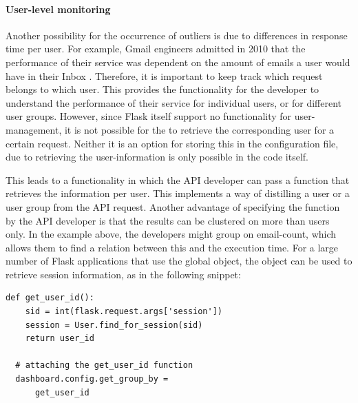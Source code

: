 \documentclass[conference]{IEEEtran}
\begin{document}
  \paragraph{User-level monitoring}
  \label{sec:user-monitoring}
  Another possibility for the occurrence of outliers is due to differences in response time per user. For example, Gmail engineers admitted in 2010 that the performance of their service was dependent on the amount of emails a user would have in their Inbox \cite{gmail}. Therefore, it is important to keep track which request belongs to which user. This provides the functionality for the developer to understand the performance of their service for individual users, or for different user groups. However, since Flask itself support no functionality for user-management, it is not possible for the \tool to retrieve the corresponding user for a certain request. Neither it is an option for storing this in the configuration file, due to retrieving the user-information is only possible in the code itself.
  
This leads to a functionality in which the API developer can pass a function that retrieves the information per user. This implements a way of distilling a user or a user group from the API request. Another advantage of specifying the function by the API developer is that the results can be clustered on more than users only. In the example above, the developers might group on email-count, which allows them to find a relation between this and the execution time. For a large number of Flask applications that use the global  object, the object can be used to retrieve session information, as in the following snippet: 
  
  \begin{lstlisting}[style=custompython,caption=App specific way of extracting the user from a Flask request object]
  def get_user_id():
    sid = int(flask.request.args['session'])
    session = User.find_for_session(sid)
    return user_id
  
  # attaching the get_user_id function
  dashboard.config.get_group_by = 
      get_user_id
  
  \end{lstlisting}
  
\end{document}
